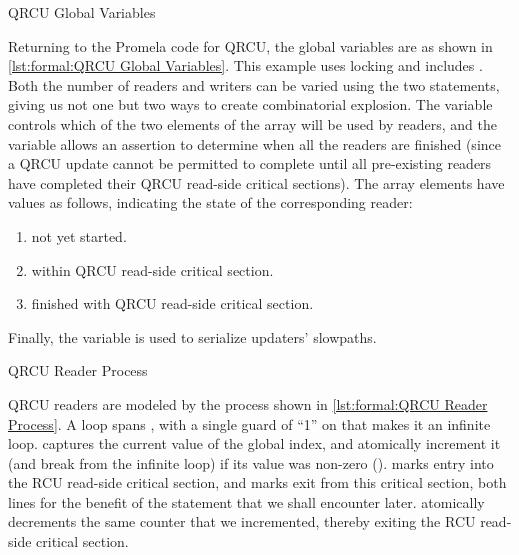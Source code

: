 \begin{listing}

\caption{QRCU Global Variables}
\label{lst:formal:QRCU Global Variables}
\end{listing}

Returning to the Promela code for QRCU, the global variables are as shown in
\cref{lst:formal:QRCU Global Variables}.
This example uses locking and includes .
Both the number of readers and writers can be varied using the
two  statements, giving us not one but two ways to create
combinatorial explosion.
The  variable controls which of the two elements of the 
array will be used by readers, and the  variable
allows an assertion to determine when all the readers are finished
(since a QRCU update cannot be permitted to complete until all
pre-existing readers have completed their QRCU read-side critical
sections).
The  array elements have values as follows,
indicating the state of the corresponding reader:

\begin{enumerate}[label={\arabic*}:,start=0,itemsep=0pt]
\item	not yet started.
\item	within QRCU read-side critical section.
\item	finished with QRCU read-side critical section.
\end{enumerate}

Finally, the  variable is used to serialize updaters' slowpaths.

\begin{listing}

\caption{QRCU Reader Process}
\label{lst:formal:QRCU Reader Process}
\end{listing}

\begin{fcvref}
QRCU readers are modeled by the  process shown in
\cref{lst:formal:QRCU Reader Process}.
A  loop spans ,
with a single guard of ``1''
on  that makes it an infinite loop.
 captures the current value of the global index,
and 
atomically increment it (and break from the infinite loop)
if its value was non-zero ().
 marks entry into the RCU read-side critical section, and
 marks exit from this critical section,
both lines for the benefit of
the  statement that we shall encounter later.
 atomically decrements the same counter that we incremented,
thereby exiting the RCU read-side critical section.
\end{fcvref}


